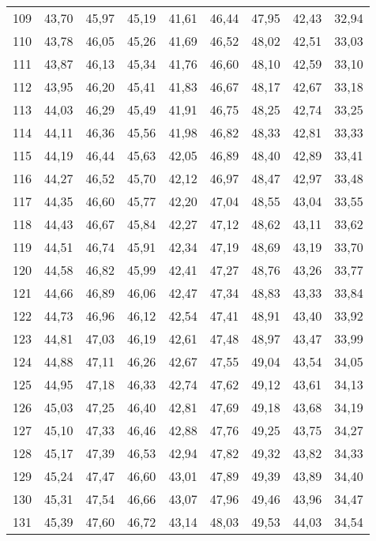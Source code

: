 \begin{longtable}{c c c c c c c c c}
      109	& 43,70	& 45,97	& 45,19	& 41,61	& 46,44	& 47,95	& 42,43	& 32,94 \\
      110	& 43,78	& 46,05	& 45,26	& 41,69	& 46,52	& 48,02	& 42,51	& 33,03 \\
      111	& 43,87	& 46,13	& 45,34	& 41,76	& 46,60	& 48,10	& 42,59	& 33,10 \\
      112	& 43,95	& 46,20	& 45,41	& 41,83	& 46,67	& 48,17	& 42,67	& 33,18 \\
      113	& 44,03	& 46,29	& 45,49	& 41,91	& 46,75	& 48,25	& 42,74	& 33,25 \\
      114	& 44,11	& 46,36	& 45,56	& 41,98	& 46,82	& 48,33	& 42,81	& 33,33 \\
      115	& 44,19	& 46,44	& 45,63	& 42,05	& 46,89	& 48,40	& 42,89	& 33,41 \\
      116	& 44,27	& 46,52	& 45,70	& 42,12	& 46,97	& 48,47	& 42,97	& 33,48 \\
      117	& 44,35	& 46,60	& 45,77	& 42,20	& 47,04	& 48,55	& 43,04	& 33,55 \\
      118	& 44,43	& 46,67	& 45,84	& 42,27	& 47,12	& 48,62	& 43,11	& 33,62 \\
      119	& 44,51	& 46,74	& 45,91	& 42,34	& 47,19	& 48,69	& 43,19	& 33,70 \\
      120	& 44,58	& 46,82	& 45,99	& 42,41	& 47,27	& 48,76	& 43,26	& 33,77 \\
      121	& 44,66	& 46,89	& 46,06	& 42,47	& 47,34	& 48,83	& 43,33	& 33,84 \\
      122	& 44,73	& 46,96	& 46,12	& 42,54	& 47,41	& 48,91	& 43,40	& 33,92 \\
      123	& 44,81	& 47,03	& 46,19	& 42,61	& 47,48	& 48,97	& 43,47	& 33,99 \\
      124	& 44,88	& 47,11	& 46,26	& 42,67	& 47,55	& 49,04	& 43,54	& 34,05 \\
      125	& 44,95	& 47,18	& 46,33	& 42,74	& 47,62	& 49,12	& 43,61	& 34,13 \\
      126	& 45,03	& 47,25	& 46,40	& 42,81	& 47,69	& 49,18	& 43,68	& 34,19 \\
      127	& 45,10	& 47,33	& 46,46	& 42,88	& 47,76	& 49,25	& 43,75	& 34,27 \\
      128	& 45,17	& 47,39	& 46,53	& 42,94	& 47,82	& 49,32	& 43,82	& 34,33 \\
      129	& 45,24	& 47,47	& 46,60	& 43,01	& 47,89	& 49,39	& 43,89	& 34,40 \\
      130	& 45,31	& 47,54	& 46,66	& 43,07	& 47,96	& 49,46	& 43,96	& 34,47 \\
      131	& 45,39	& 47,60	& 46,72	& 43,14	& 48,03	& 49,53	& 44,03	& 34,54 \\

\end{longtable}
